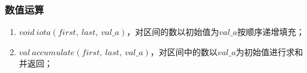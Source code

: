 \subsubsection{数值运算}
\begin{enumerate}
    \item $void\ iota(first,\ last,\ val\_a)$，对区间的数以初始值为$val\_a$按顺序递增填充；
    \item $val\ accumulate(first,\ last,\ val\_a)$，对区间中的数以$val\_a$为初始值进行求和并返回；
\end{enumerate}
